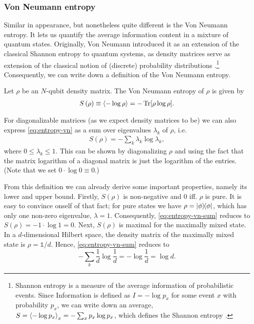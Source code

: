\subsubsection{Von Neumann entropy}
Similar in appearance, but nonetheless quite different is the Von Neumann
entropy. It lets us quantify the average information content in a mixture of
quantum states. Originally, Von Neumann introduced it as an extension of the
classical Shannon entropy to quantum systems, as density matrices serve as
extension of the classical notion of (discrete) probability distributions
\cite{vonneumannMathematischeGrundlagenQuantenmechanik1968}.\footnote{Shannon
  entropy is a measure of the average information of probabilistic events.
  Since Information is defined as $I=-\log p_x$ for some event $x$ with
  probability $p_x$, we can write down an average, $S = \expval{-\log p_x}_x =
  -\sum_x p_x \log p_x$, which defines the Shannon entropy
\cite{shannonMathematicalTheoryCommunication1948}.} 
Consequently, we can write down a definition of the Von Neumann entropy.
\begin{defn}\label{defn:vonneumann}
  Let $\rho$ be an $N$-qubit density matrix. The Von Neumann entropy of $\rho$
  is given by
  \begin{align}\label{eq:entropy-vn}
    S\left(\rho\right) \equiv \expval{-\log \rho} = -\Tr[\rho\log\rho]
  .\end{align}
\end{defn}
For diagonalizable matrices (as we expect density matrices to be) we can also
express \cref{eq:entropy-vn} as a sum over eigenvalues $\lambda_k$ of $\rho$, i.e.
\begin{align}\label{eq:entropy-vn-sum}
  S\left(\rho\right) = -\sum_k \lambda_k \log \lambda_k
,\end{align}
where $0\leq\lambda_k\leq 1$.
This can be shown by diagonalizing $\rho$ and using the fact that the matrix
logarithm of a diagonal matrix is just the logarithm of the entries.
(Note that we set $0\cdot\log 0 \equiv 0$.)

From this definition we can already derive some important properties, namely
its lower and upper bound. Firstly, $S(\rho)$ is non-negative and $0$ iff.
$\rho$ is pure. It is easy to convince onself of that fact; for pure states we
have $\rho = \dyad{\phi}$, which has only one non-zero eigenvalue, $\lambda =
1$. Consequently, \cref{eq:entropy-vn-sum} reduces to $S(\rho) = - 1\cdot\log 1
=0$.  Next, $S(\rho)$ is maximal for the maximally mixed state. In a
$d$-dimensional Hilbert space, the density matrix of the maximally mixed state
is $\rho = \mathds{1}/d$. Hence, \cref{eq:entropy-vn-sum} reduces to
\[
  -\sum_k \frac{1}{d} \log \frac{1}{d} = -\log \frac{1}{d} = \log d
.\]
